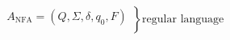 \vspace{0.5em}
\[\left.
    \begin{array}{l}
    A_{\text{NFA}} = (Q,\Sigma,\delta,q_{0},F)\\

    \end{array}
    \right\} \text{regular language}
\]
